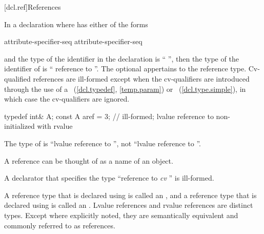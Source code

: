 [dcl.ref]{References}%

\pnum
In a declaration
where
has either of the forms

\begin{ncsimplebnf}
\terminal{\&} attribute-specifier-seq\opt{} \br
\terminal{\&\&} attribute-specifier-seq\opt{} 
\end{ncsimplebnf}

and the type of the identifier in the declaration
is ``
'',
then the type of the identifier of
is `` reference to
''.
The optional  appertains to the reference type.
Cv-qualified references are ill-formed except when the cv-qualifiers
are introduced through the use of a
~(\ref{dcl.typedef}, \ref{temp.param}) or
~(\ref{dcl.type.simple}),
in which case the cv-qualifiers are ignored.
\begin{example}

\begin{codeblock}
typedef int& A;
const A aref = 3;   // ill-formed; lvalue reference to non- initialized with rvalue
\end{codeblock}

The type of
is ``lvalue reference to '',
not ``lvalue reference to ''.
\end{example}
\begin{note}
A reference can be thought of as a name of an object.
\end{note}
%
A declarator that specifies the type
``reference to \textit{cv} ''
is ill-formed.


\pnum
{}%
%
A reference type that is declared using \tcode{\&} is called an
, and a reference type that
is declared using \tcode{\&\&} is called an
. Lvalue references and
rvalue references are distinct types. Except where explicitly noted, they are
semantically equivalent and commonly referred to as references.

